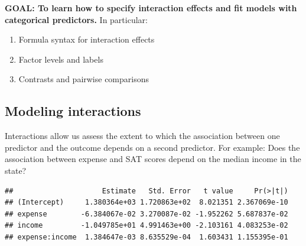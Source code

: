 \documentclass[]{book}
\newenvironment{Shaded}{\begin{snugshade}}{\end{snugshade}}
\newcommand{\CommentTok}[1]{\textcolor[rgb]{0.56,0.35,0.01}{\textit{#1}}}
\newcommand{\DataTypeTok}[1]{\textcolor[rgb]{0.13,0.29,0.53}{#1}}
\newcommand{\DecValTok}[1]{\textcolor[rgb]{0.00,0.00,0.81}{#1}}
\newcommand{\KeywordTok}[1]{\textcolor[rgb]{0.13,0.29,0.53}{\textbf{#1}}}
\newcommand{\NormalTok}[1]{#1}
\newcommand{\OperatorTok}[1]{\textcolor[rgb]{0.81,0.36,0.00}{\textbf{#1}}}
\newcommand{\StringTok}[1]{\textcolor[rgb]{0.31,0.60,0.02}{#1}}
\providecommand{\tightlist}{%
  \setlength{\itemsep}{0pt}\setlength{\parskip}{0pt}}
\begin{document}
\textbf{GOAL: To learn how to specify interaction effects and fit models with categorical predictors.} In particular:

\begin{enumerate}
\def\labelenumi{\arabic{enumi}.}
\tightlist
\item
  Formula syntax for interaction effects
\item
  Factor levels and labels
\item
  Contrasts and pairwise comparisons
\end{enumerate}

\hypertarget{modeling-interactions}{%
\subsection{Modeling interactions}\label{modeling-interactions}}

Interactions allow us assess the extent to which the association between one predictor and the outcome depends on a second predictor. For example: Does the association between expense and SAT scores depend on the median income in the state?

\begin{Shaded}
\end{Shaded}

\begin{verbatim}
##                     Estimate   Std. Error   t value     Pr(>|t|)
## (Intercept)     1.380364e+03 1.720863e+02  8.021351 2.367069e-10
## expense        -6.384067e-02 3.270087e-02 -1.952262 5.687837e-02
## income         -1.049785e+01 4.991463e+00 -2.103161 4.083253e-02
## expense:income  1.384647e-03 8.635529e-04  1.603431 1.155395e-01
\end{verbatim}
\end{document}
